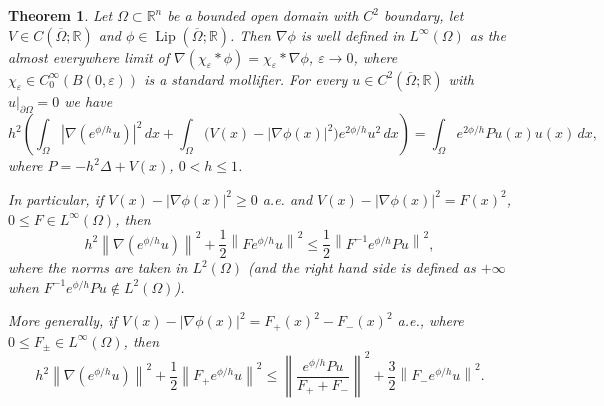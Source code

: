 \documentclass[11pt,a4paper]{article}
\newcommand{\R}{\mathbb R}
\newcommand{\Lip}{\operatorname{Lip}}
\newcommand{\eps}{\varepsilon}
\newcommand{\norm}[1]{\left\lVert #1\right\rVert}
\numberwithin{equation}{section}
\newtheorem{theorem}{Theorem}[section]
\theoremstyle{remark}
\begin{document}
\begin{theorem}
Let $\Omega\subset\R^n$ be a bounded open domain with $C^2$ boundary, let $V\in C(\overline\Omega;\R)$ and $\phi\in\Lip(\overline\Omega;\R)$. Then $\nabla\phi$ is well defined in $L^\infty(\Omega)$ as the almost everywhere limit of $\nabla(\chi_\eps*\phi)=\chi_\eps*\nabla\phi$, $\eps\to0$, where $\chi_\eps\in C_0^\infty(B(0,\eps))$ is a standard mollifier. For every $u\in C^2(\overline\Omega;\R)$ with $u|_{\partial\Omega}=0$ we have
\begin{equation}
 h^2\left(\int_\Omega |\nabla(e^{\phi/h}u)|^2\,dx+
 \int_\Omega\bigl(V(x)-|\nabla\phi(x)|^2\bigr)e^{2\phi/h}u^2\,dx\right)
 =\int_\Omega e^{2\phi/h}Pu(x)u(x)\,dx,
\end{equation}
where $P=-h^2\Delta+V(x)$, $0<h\le1$.

In particular, if $V(x)-|\nabla\phi(x)|^2\ge0$ a.e. and $V(x)-|\nabla\phi(x)|^2=F(x)^2$, $0\le F\in L^\infty(\Omega)$, then
\begin{equation}
h^2\norm{\nabla(e^{\phi/h}u)}^2+\frac12\norm{Fe^{\phi/h}u}^2
\le \frac12\norm{F^{-1}e^{\phi/h}Pu}^2,
\end{equation}
where the norms are taken in $L^2(\Omega)$ (and the right hand side is defined as $+\infty$ when $F^{-1}e^{\phi/h}Pu\notin L^2(\Omega)$).

More generally, if $V(x)-|\nabla\phi(x)|^2=F_+(x)^2-F_-(x)^2$ a.e., where $0\le F_\pm\in L^\infty(\Omega)$, then
\begin{equation}
h^2\norm{\nabla(e^{\phi/h}u)}^2+\frac12\norm{F_+e^{\phi/h}u}^2
\le \norm{\frac{e^{\phi/h}Pu}{F_++F_-}}^2
+\frac32\norm{F_-e^{\phi/h}u}^2.
\end{equation}
\end{theorem}
\end{document}
